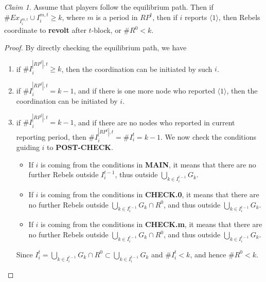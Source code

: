 \documentclass[12pt,letter]{article}
\theoremstyle{definition}
\theoremstyle{remark}
\theoremstyle{claim}
\newtheorem{claim}{Claim}
\begin{document}
\begin{claim}
\label{claim_either_success_or_fail}
Assume that players follow the equilibrium path. Then if $\#Ex_{I^{m,t}_i}\cup I^{m,t}_i\geq k$, where $m$ is a period in $RP^t$, then if $i$ reports $\langle 1 \rangle$, then Rebels coordinate to \textbf{revolt} after $t$-block, or $\# R^0<k$.
\end{claim}
\begin{proof}
By directly checking the equilibrium path, we have
\begin{enumerate}
\item if $\# I^{|RP^t|,t}_i\geq k$, then the coordination can be initiated by such $i$.
\item if $\# I^{|RP^t|,t}_i= k-1$, and if there is one more node who reported $\langle 1 \rangle$, then the coordination can be initiated by $i$.
\item if $\# I^{|RP^t|,t}_i= k-1$, and if there are no nodes who reported in current reporting period, then $\# I^{|RP^t|,t}_i=\# I^{t}_i= k-1$. We now check the conditions guiding $i$ to \textbf{POST-CHECK}.
\begin{itemize}
\item If $i$ is coming from the conditions in \textbf{MAIN}, it means that there are no further Rebels outside $I^{t-1}_i$, thus outside $\bigcup_{k\in I^{t-1}_i}G_k$.
\item If $i$ is coming from the conditions in \textbf{CHECK.0}, it means that there are no further Rebels outside $\bigcup_{k\in I^{t-1}_i}G_k\cap R^0$, and thus outside $\bigcup_{k\in I^{t-1}_i}G_k$. 
\item If $i$ is coming from the conditions in \textbf{CHECK.m}, it means that there are no further Rebels outside $\bigcup_{k\in I^{t-1}_i}G_k\cap R^0$, and thus outside $\bigcup_{k\in I^{t-1}_i}G_k$. 
\end{itemize}
Since $I^t_i=\bigcup_{k\in I^{t-1}_i}G_k\cap R^0 \subset \bigcup_{k\in I^{t-1}_i}G_k$ and $\#I^t_i<k$, and hence $\# R^0<k$.

\end{enumerate}


\end{proof}
\end{document}
